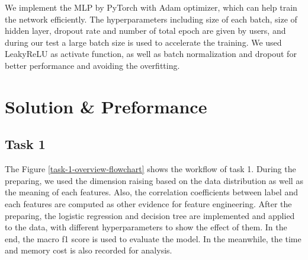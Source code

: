 \documentclass[11pt]{article}
\begin{document}
We implement the MLP by PyTorch with Adam optimizer, which can help train the network efficiently. The hyperparameters including size of each batch, size of hidden layer, dropout rate and number of total epoch are given by users, and during our test a large batch size is used to accelerate the training. We used LeakyReLU as activate function, as well as batch normalization and dropout for better performance and avoiding the overfitting.

\section{Solution \& Preformance}

\subsection{Task 1}

The Figure \ref{task-1-overview-flowchart} shows the workflow of task 1. During the preparing, we used the dimension raising based on the data distribution as well as the meaning of each features. Also, the correlation coefficients between label and each features are computed as other evidence for feature engineering. After the preparing, the logistic regression and decision tree are implemented and applied to the data, with different hyperparameters to show the effect of them. In the end, the macro f1 score is used to evaluate the model. In the meanwhile, the time and memory cost is also recorded for analysis.
\end{document}
